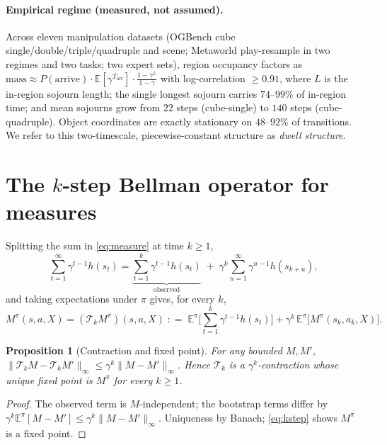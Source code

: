 \documentclass{article}
\newtheorem{proposition}{Proposition}
\newcommand{\M}{M}
\newcommand{\Tk}{\mathcal{T}_k}
\providecommand{\E}{\mathbb{E}}
\begin{document}
\paragraph{Empirical regime (measured, not assumed).}
Across eleven manipulation datasets (OGBench cube single/double/triple/quadruple
and scene; Metaworld play-resample in two regimes and two tasks; two expert
sets), region occupancy factors as
\(\text{mass}\approx P(\text{arrive})\cdot\E[\gamma^{T_{\mathrm{arr}}}]\cdot
\frac{1-\gamma^{L}}{1-\gamma}\)
with log-correlation \(\ge 0.91\), where \(L\) is the in-region sojourn length;
the single longest sojourn carries \(74\)--\(99\%\) of in-region time; and mean
sojourns grow from \(22\) steps (cube-single) to \(140\) steps
(cube-quadruple). Object coordinates are exactly stationary on
\(48\)--\(92\%\) of transitions. We refer to this two-timescale,
piecewise-constant structure as \emph{dwell structure}.

\section{The \texorpdfstring{$k$}{k}-step Bellman operator for measures}

Splitting the sum in \eqref{eq:measure} at time \(k\ge 1\),
\begin{equation}
\sum_{t=1}^{\infty}\gamma^{t-1}h(s_t)
=\underbrace{\sum_{t=1}^{k}\gamma^{t-1}h(s_t)}_{\text{observed}}
\;+\;\gamma^{k}\sum_{u=1}^{\infty}\gamma^{u-1}h(s_{k+u}),
\end{equation}
and taking expectations under \(\pi\) gives, for every \(k\),
\begin{equation}
\M^\pi(s,a,X)=(\Tk \M^\pi)(s,a,X)
\;\mathrel{{:}{=}}\;
\E^\pi\!\Big[\sum_{t=1}^{k}\gamma^{t-1}h(s_t)\Big]
+\gamma^{k}\,\E^\pi\big[\M^\pi(s_k,a_k,X)\big].
\label{eq:kstep}
\end{equation}

\begin{proposition}[Contraction and fixed point]
\label{prop:contraction}
For any bounded \(\M,\M'\),
\(\|\Tk \M-\Tk \M'\|_\infty\le\gamma^{k}\|\M-\M'\|_\infty\).
Hence \(\Tk\) is a \(\gamma^k\)-contraction whose unique fixed point is
\(\M^\pi\) for every \(k\ge1\).
\end{proposition}
\begin{proof}
The observed term is \(\M\)-independent; the bootstrap terms differ by
\(\gamma^k\E^\pi[\M-\M']\le\gamma^k\|\M-\M'\|_\infty\). Uniqueness by Banach;
\eqref{eq:kstep} shows \(\M^\pi\) is a fixed point.
\end{proof}
\end{document}
